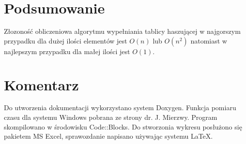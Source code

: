 \section{Podsumowanie}
Złozoność obliczeniowa algorytmu wypełniania tablicy haszującej w najgorszym przypadku dla dużej ilości elementów jest $O(n)$ lub $O(n^{2})$ natomiast w najlepszym przypadku dla małej ilości jest $O(1)$.
\section{Komentarz}
Do utworzenia dokumentacji wykorzystano system Doxygen.
Funkcja pomiaru czasu dla systemu Windows pobrana ze strony dr. J. Mierzwy. Program skompilowano w środowisku Code::Blocks. Do stworzonia wykresu posłużono się pakietem MS Excel, sprawozdanie napisano używając systemu \LaTeX.

